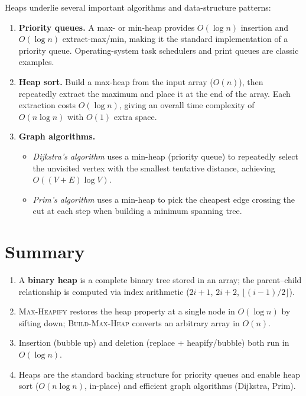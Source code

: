\documentclass[11pt, a4paper, notitlepage]{report}
\theoremstyle{definition}
\theoremstyle{remark}
\theoremstyle{definition}
\begin{document}
Heaps underlie several important algorithms and data-structure patterns:

\begin{enumerate}
  \item \textbf{Priority queues.}  A max- or min-heap provides $O(\log n)$ insertion and $O(\log n)$ extract-max/min, making it the standard implementation of a priority queue.  Operating-system task schedulers and print queues are classic examples.

  \item \textbf{Heap sort.}  Build a max-heap from the input array ($O(n)$), then repeatedly extract the maximum and place it at the end of the array.  Each extraction costs $O(\log n)$, giving an overall time complexity of $O(n\log n)$ with $O(1)$ extra space.

  \item \textbf{Graph algorithms.}
  \begin{itemize}
    \item \emph{Dijkstra's algorithm} uses a min-heap (priority queue) to repeatedly select the unvisited vertex with the smallest tentative distance, achieving $O((V+E)\log V)$.
    \item \emph{Prim's algorithm} uses a min-heap to pick the cheapest edge crossing the cut at each step when building a minimum spanning tree.
  \end{itemize}
\end{enumerate}

\section{Summary}
\label{sec:heap-summary}

\begin{keyresult}[title={Key Result: Heap Operations}]
\begin{enumerate}
  \item A \textbf{binary heap} is a complete binary tree stored in an array; the parent--child
        relationship is computed via index arithmetic ($2i+1$, $2i+2$, $\lfloor(i-1)/2\rfloor$).
  \item \textsc{Max-Heapify} restores the heap property at a single node in $O(\log n)$ by
        sifting down; \textsc{Build-Max-Heap} converts an arbitrary array in $O(n)$.
  \item Insertion (bubble up) and deletion (replace + heapify/bubble) both run in $O(\log n)$.
  \item Heaps are the standard backing structure for priority queues and enable heap sort
        ($O(n\log n)$, in-place) and efficient graph algorithms (Dijkstra, Prim).
\end{enumerate}
\end{keyresult}
\end{document}
